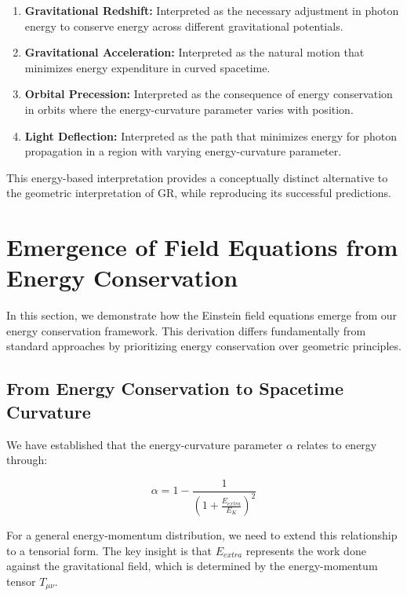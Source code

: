 \documentclass[11pt,a4paper]{article}
\begin{document}
\begin{enumerate}
    \item \textbf{Gravitational Redshift:} Interpreted as the necessary adjustment in photon energy to conserve energy across different gravitational potentials.
    
    \item \textbf{Gravitational Acceleration:} Interpreted as the natural motion that minimizes energy expenditure in curved spacetime.
    
    \item \textbf{Orbital Precession:} Interpreted as the consequence of energy conservation in orbits where the energy-curvature parameter varies with position.
    
    \item \textbf{Light Deflection:} Interpreted as the path that minimizes energy for photon propagation in a region with varying energy-curvature parameter.
\end{enumerate}

This energy-based interpretation provides a conceptually distinct alternative to the geometric interpretation of GR, while reproducing its successful predictions.

\section{Emergence of Field Equations from Energy Conservation}\label{sec:einstein}

In this section, we demonstrate how the Einstein field equations emerge from our energy conservation framework. This derivation differs fundamentally from standard approaches by prioritizing energy conservation over geometric principles.

\subsection{From Energy Conservation to Spacetime Curvature}

We have established that the energy-curvature parameter $\alpha$ relates to energy through:

\begin{equation}
    \alpha = 1 - \frac{1}{\left(1 + \frac{E_{extra}}{E_K}\right)^2}
\end{equation}

For a general energy-momentum distribution, we need to extend this relationship to a tensorial form. The key insight is that $E_{extra}$ represents the work done against the gravitational field, which is determined by the energy-momentum tensor $T_{\mu\nu}$.
\end{document}
